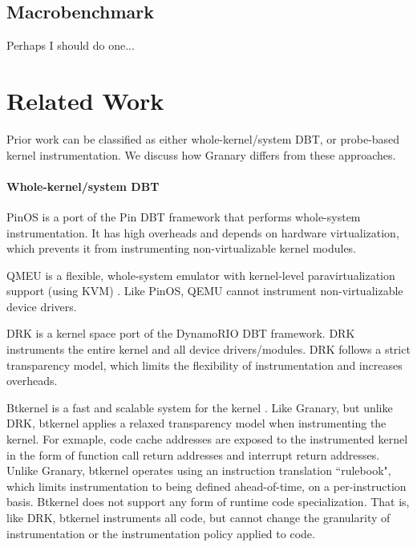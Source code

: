 \documentclass[preprint]{sigplanconf}
\newcommand{\toolname}[1]{{\scshape #1}}
\begin{document}
\subsection{Macrobenchmark}\label{sec:macrobenchmark}

Perhaps I should do one...




\section{Related Work}\label{sec:related}
Prior work can be classified as either whole-kernel/system DBT, or probe-based kernel instrumentation. We discuss how Granary differs from these approaches.
\paragraph{Whole-kernel/system DBT}
PinOS \cite{PinOS} is a port of the Pin \cite{Pin} DBT framework that performs whole-system instrumentation. It has high overheads and depends on hardware virtualization, which prevents it from instrumenting non-virtualizable kernel modules. 

QMEU is a flexible, whole-system emulator with kernel-level paravirtualization support (using KVM) \cite{QEMU}. Like PinOS, QEMU cannot instrument non-virtualizable device drivers.

DRK \cite{DRK} is a kernel space port of the DynamoRIO \cite{DynamoRIO} DBT framework. DRK instruments the entire kernel and all device drivers/modules. DRK follows a strict transparency model, which limits the flexibility of instrumentation and increases overheads. 

Btkernel is a fast and scalable system for the kernel \cite{btkernel}. Like Granary, but unlike DRK, btkernel applies a relaxed transparency model when instrumenting the kernel. For exmaple, code cache addresses are exposed to the instrumented kernel in the form of function call return addresses and interrupt return addresses. Unlike Granary, btkernel operates using an instruction translation ``rulebook", which limits instrumentation to being defined ahead-of-time, on a per-instruction basis. Btkernel does not support any form of runtime code specialization. That is, like DRK, btkernel instruments all code, but cannot change the granularity of instrumentation or the instrumentation policy applied to code.
\end{document}

